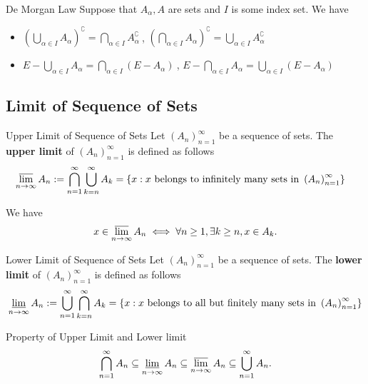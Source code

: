 \begin{proposition}{De Morgan Law}{}
	Suppose that $A_\alpha,A$ are sets and $I$ is some index set. We have
	\begin{itemize}
		\item $\left(\bigcup\limits_{\alpha\in I}A_\alpha\right)^\complement=\bigcap\limits_{\alpha\in I}A_\alpha^{\complement}\ $, $\left(\bigcap\limits_{\alpha\in I}A_\alpha\right)^\complement=\bigcup\limits_{\alpha\in I}A_\alpha^{\complement}$
		\item $E-\bigcup\limits_{\alpha\in I}A_\alpha=\bigcap\limits_{\alpha\in I}\left(E-A_\alpha\right)\ $, $E-\bigcap\limits_{\alpha\in I}A_\alpha=\bigcup\limits_{\alpha\in I}\left(E-A_\alpha\right)$
	\end{itemize}
\end{proposition}


\subsection{Limit of Sequence of Sets}
\begin{definition}{Upper Limit of Sequence of Sets}{}
	Let $\left(A_n\right)_{n=1}^{\infty}$ be a sequence of sets. The \textbf{upper limit} of $\left(A_n\right)_{n=1}^{\infty}$ is defined as follows
	\begin{align*}
		\operatorname*{\overline{lim}}_{n\to\infty}A_n&:=\bigcap_{n=1}^\infty\bigcup_{k=n}^\infty A_k=\left\{x:x\text{ belongs to infinitely many sets in }\left(A_n\right)_{n=1}^{\infty}\right\}
	\end{align*}
\end{definition}

We have
\[
	x\in \operatorname*{\overline{lim}}_{n\to\infty}A_n\iff \forall n\ge1,\exists k\ge n,x\in A_k.
\]

\begin{definition}{Lower Limit of Sequence of Sets}{}
	Let $\left(A_n\right)_{n=1}^{\infty}$ be a sequence of sets. The \textbf{lower limit} of $\left(A_n\right)_{n=1}^{\infty}$ is defined as follows
	\begin{align*}
		\operatorname*{\underline{lim}}_{n\to\infty}A_n&:=\bigcup_{n=1}^\infty\bigcap_{k=n}^\infty A_k=\left\{x:x\text{ belongs to all but finitely many sets in }\left(A_n\right)_{n=1}^{\infty}\right\}\\
	\end{align*}
\end{definition}

\begin{proposition}{Property of Upper Limit and Lower limit}{}
	\[
		\bigcap_{n=1}^\infty A_n\subseteq\operatorname*{\underline{lim}}_{n\to\infty}A_n\subseteq\operatorname*{\overline{lim}}_{n\to\infty}A_n\subseteq \bigcup_{n=1}^\infty A_n.
	\]
\end{proposition}

